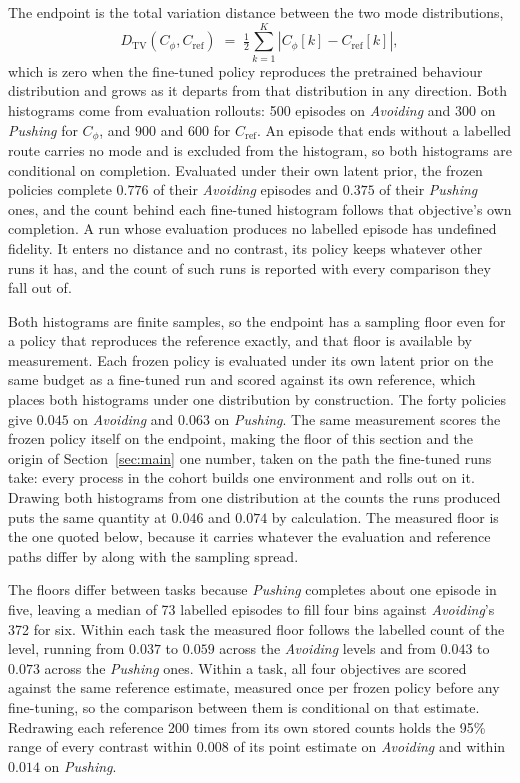 \documentclass[preprint,12pt]{elsarticle}
\begin{document}
The endpoint is the total variation distance between the two mode
distributions,
\begin{equation}\label{eq:fidelity}
  D_{\mathrm{TV}}(C_\phi, C_{\mathrm{ref}})
  \;=\; \tfrac{1}{2} \sum_{k=1}^{K}
  \left| C_\phi[k] - C_{\mathrm{ref}}[k] \right| ,
\end{equation}
which is zero when the fine-tuned policy reproduces the pretrained behaviour
distribution and grows as it departs from that distribution in any direction.
Both histograms come from evaluation rollouts: 500 episodes on \emph{Avoiding}
and 300 on \emph{Pushing} for $C_\phi$, and 900 and 600 for $C_{\mathrm{ref}}$.
An episode that ends without a labelled route carries no mode
and is excluded from the histogram, so both histograms are conditional on
completion. Evaluated under their own latent prior, the frozen policies
complete $0.776$ of their \emph{Avoiding} episodes and $0.375$ of their
\emph{Pushing} ones, and the count behind each fine-tuned histogram follows
that objective's own completion. A run whose evaluation produces no labelled
episode has undefined fidelity. It enters no distance and no contrast, its
policy keeps whatever other runs it has, and the count of such runs is reported
with every comparison they fall out of.

Both histograms are finite samples, so the endpoint has a sampling floor even
for a policy that reproduces the reference exactly, and that floor is
available by measurement.
Each frozen policy is evaluated under its own latent prior on the same budget
as a fine-tuned run and scored against its own reference, which places both
histograms under one distribution by construction. The forty policies give
$0.045$ on \emph{Avoiding} and $0.063$ on \emph{Pushing}. The same measurement
scores the frozen policy itself on the endpoint, making the floor of this
section and the origin of Section~\ref{sec:main} one number, taken on the path
the fine-tuned runs take: every process in the cohort builds one environment
and rolls out on it. Drawing both histograms from one distribution at the
counts the runs produced puts the same quantity at $0.046$ and $0.074$ by
calculation. The measured floor is the one quoted below, because it carries
whatever the evaluation and reference paths differ by along with the sampling
spread.

The floors differ between tasks because
\emph{Pushing} completes about one episode in five, leaving a median of 73
labelled episodes to fill four bins against \emph{Avoiding}'s 372 for six.
Within each task the measured floor follows the labelled count of the level,
running from $0.037$ to $0.059$ across the \emph{Avoiding} levels and from
$0.043$ to $0.073$ across the \emph{Pushing} ones. Within a task, all four
objectives are scored against the same reference estimate, measured once per
frozen policy before any fine-tuning, so the comparison between them is
conditional on that estimate. Redrawing each reference 200 times from its own
stored counts holds the 95\% range of every contrast within $0.008$ of its
point estimate on \emph{Avoiding} and within $0.014$ on \emph{Pushing}.
\end{document}
